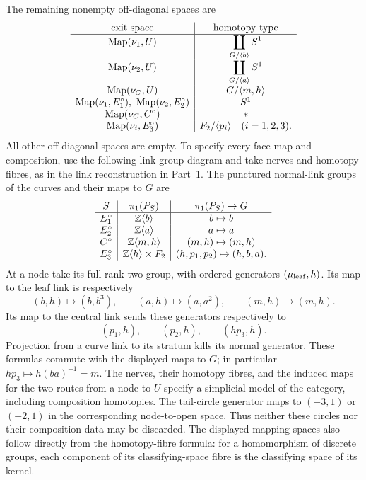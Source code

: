 The remaining nonempty off-diagonal spaces are
\[
\begin{array}{c|c}
\text{exit space}&\text{homotopy type}\\ \hline
\operatorname{Map}(\nu_1,U)&\displaystyle\coprod_{G/\langle b\rangle}S^1\\
\operatorname{Map}(\nu_2,U)&\displaystyle\coprod_{G/\langle a\rangle}S^1\\
\operatorname{Map}(\nu_C,U)&G/\langle m,h\rangle\\
\operatorname{Map}(\nu_1,E_1^\circ),\ \operatorname{Map}(\nu_2,E_2^\circ)&S^1\\
\operatorname{Map}(\nu_C,C^\circ)&*\\
\operatorname{Map}(\nu_i,E_3^\circ)&F_2/\langle p_i\rangle\quad(i=1,2,3).
\end{array}
\]
All other off-diagonal spaces are empty. To specify every face map
and composition, use the following link-group diagram and take
nerves and homotopy fibres, as in the link reconstruction in Part~1.
The punctured normal-link groups of the curves and their maps to $G$
are
\[
\begin{array}{c|c|c}
S&\pi _1(P_S)&\pi _1(P_S)\to G\\ \hline
E_1^\circ&\mathbb Z\langle b\rangle&b\mapsto b\\
E_2^\circ&\mathbb Z\langle a\rangle&a\mapsto a\\
C^\circ&\mathbb Z\langle m,h\rangle&(m,h)\mapsto(m,h)\\
E_3^\circ&\mathbb Z\langle h\rangle\times F_2&
             (h,p_1,p_2)\mapsto(h,b,a).
\end{array}
\]
At a node take its full rank-two group, with ordered generators
$(\mu_{\rm leaf},h)$. Its map to the leaf link is respectively
\[
 (b,h)\mapsto(b,b^3),\qquad
 (a,h)\mapsto(a,a^2),\qquad
 (m,h)\mapsto(m,h).
\]
Its map to the central link sends these generators respectively to
\[
 (p_1,h),\qquad(p_2,h),\qquad(hp_3,h).
\]
Projection from a curve link to its stratum kills its normal
generator. These formulas commute with the displayed maps to $G$;
in particular $hp_3\mapsto h(ba)^{-1}=m$. The nerves, their
homotopy fibres, and the induced maps for the two routes from a
node to $U$ specify a simplicial model of the category, including
composition homotopies. The tail-circle generator maps to
$(-3,1)$ or $(-2,1)$ in the corresponding node-to-open space.
Thus neither these circles nor their composition data may be
discarded. The displayed mapping spaces also follow directly from
the homotopy-fibre formula: for a homomorphism of discrete groups,
each component of its classifying-space fibre is the classifying
space of its kernel.

